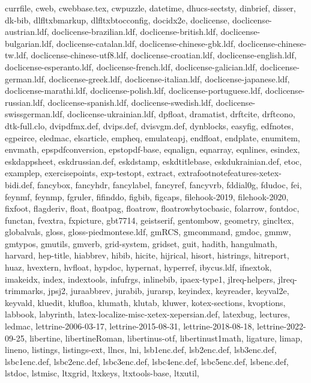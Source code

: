 \documentclass{l3in2edoc}
\begin{document}
{  currfile, cweb, cwebbase.tex, cwpuzzle, datetime, dhucs-sectsty,
  dinbrief, disser, dk-bib, dlfltxbmarkup, dlfltxbtocconfig, docidx2e,
  doclicense, doclicense-austrian.ldf, doclicense-brazilian.ldf,
  doclicense-british.ldf, doclicense-bulgarian.ldf,
  doclicense-catalan.ldf, doclicense-chinese-gbk.ldf,
  doclicense-chinese-tw.ldf, doclicense-chinese-utf8.ldf,
  doclicense-croatian.ldf, doclicense-english.ldf,
  doclicense-esperanto.ldf, doclicense-french.ldf,
  doclicense-galician.ldf, doclicense-german.ldf, doclicense-greek.ldf,
  doclicense-italian.ldf, doclicense-japanese.ldf,
  doclicense-marathi.ldf, doclicense-polish.ldf,
  doclicense-portuguese.ldf, doclicense-russian.ldf,
  doclicense-spanish.ldf, doclicense-swedish.ldf,
  doclicense-swissgerman.ldf, doclicense-ukrainian.ldf, dpfloat,
  dramatist, drftcite, drftcono, dtk-full.clo, dvipdfmx.def, dvips.def,
  dvisvgm.def, dynblocks, easyfig, edfnotes, egpeirce, eledmac,
  elsarticle, empheq, emulateapj, endfloat, endplate, enumitem, envmath,
  epspdfconversion, epstopdf-base, eqnalign, eqnarray, eqnlines,
  esindex, eskdappsheet, eskdrussian.def, eskdstamp, eskdtitlebase,
  eskdukrainian.def, etoc, examplep, exercisepoints, exp-testopt,
  extract, extrafootnotefeatures-xetex-bidi.def, fancybox, fancyhdr,
  fancylabel, fancyref, fancyvrb, fddial0g, fdudoc, fei, feynmf, feynmp,
  fgruler, fifinddo, figbib, figcaps, filehook-2019, filehook-2020,
  fixfoot, flagderiv, float, floatpag, floatrow, floatrowbytocbasic,
  folarrow, fontdoc, functan, fvextra, fxpicture, gbt7714, geistserif,
  gentombow, geometry, gincltex, globalvals, gloss,
  gloss-piedmontese.ldf, gmRCS, gmcommand, gmdoc, gmmw, gmtypos,
  gmutils, gmverb, grid-system, gridset, guit, hadith, hangulmath,
  harvard, hep-title, hiabbrev, hibib, hicite, hijrical, hisort,
  histrings, hitreport, huaz, hvextern, hvfloat, hypdoc, hypernat,
  hyperref, ibycus.ldf, ifnextok, imakeidx, index, indextools, infufrgs,
  inlinebib, ipaex-type1, jlreq-helpers, jlreq-trimmarks, jpsj2,
  juraabbrev, jurabib, jurarsp, keyindex, keyreader, keyval2e, keyvald,
  kluedit, klufloa, klumath, klutab, kluwer, kotex-sections, kvoptions,
  labbook, labyrinth, latex-localize-misc-xetex-xepersian.def, latexbug,
  lectures, ledmac, lettrine-2006-03-17, lettrine-2015-08-31,
  lettrine-2018-08-18, lettrine-2022-09-25, libertine, libertineRoman,
  libertinus-otf, libertinust1math, ligature, limap, lineno, listings,
  listings-ext, llncs, lni, lsb1enc.def, lsb2enc.def, lsb3enc.def,
  lsbc1enc.def, lsbc2enc.def, lsbc3enc.def, lsbc4enc.def, lsbc5enc.def,
  lsbenc.def, lstdoc, lstmisc, ltxgrid, ltxkeys, ltxtools-base, ltxutil,
}
\end{document}
